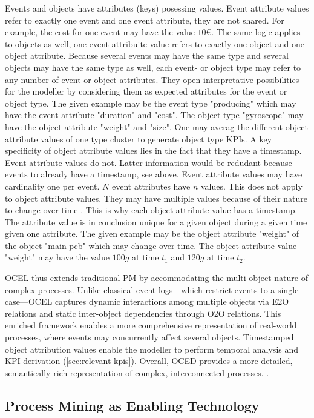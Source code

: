 Events and objects have attributes (keys) posessing values. Event attribute values refer to exactly one event and one event attribute, they are not shared. For example, the cost for one event may have the value $10€$. The same logic applies to objects as well, one event attribuite value refers to exactly one object and one object attribute. Because several events may have the same type and several objects may have the same type as well, each event- or object type may refer to any number of event or object attributes. They open interpretative possibilities for the modeller by considering them as expected attributes for the event or object type. The given example may be the event type "producing" which may have the event attribute "duration" and "cost". The object type "gyroscope" may have the object attribute "weight" and "size". One may averag the different object attribute values of one type cluster to generate object type KPIs. A key specificity of object attribute values lies in the fact that they have a timestamp. Event attribute values do not. Latter information would be redudant because events to already have a timestamp, see above. Event attribute values may have cardinality one per event. $N$ event attributes have $n$ values. This does not apply to object attribute values. They may have multiple values because of their nature to change over time \autocite{van2023object}. This is why each object attribute value has a timestamp. The attribute value is in conclusion unique for a given object during a given time given one attribute. The given example may be the object attribute "weight" of the object "main pcb" which may change over time. The object attribute value "weight" may have the value $100g$ at time $t_1$ and $120g$ at time $t_2$.


OCEL thus extends traditional PM by accommodating the  multi-object nature of complex processes. Unlike classical event logs—which restrict events to a single case—OCEL captures dynamic interactions among multiple objects via E2O relations and static inter-object dependencies through O2O relations. This enriched framework enables a more comprehensive representation of real-world processes, where events may concurrently affect several objects. Timestamped object attribution values enable the modeller to perform temporal analysis and KPI derivation (\autoref{sec:relevant-kpis}). Overall, OCED provides a more detailed, semantically rich representation of complex, interconnected processes. \autocite{van2023object}.

\subsection{Process Mining as Enabling Technology}
\label{sec:process-mining-enabling-technology}

